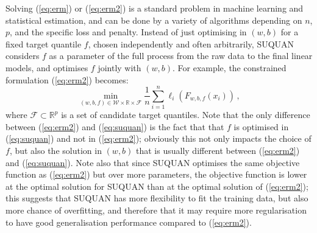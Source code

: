 \documentclass{article}
\newcommand{\RR}{\mathbb{R}} %
\newcommand{\Fcal}{\mathcal{F}}
\newcommand{\Wcal}{\mathcal{W}}
\begin{document}
Solving (\ref{eq:erm}) or (\ref{eq:erm2}) is a standard problem in machine learning and statistical estimation, and can be done by a variety of algorithms depending on $n$, $p$, and the specific loss and penalty. Instead of just optimising in $(w,b)$ for a fixed target quantile $f$, chosen independently and often arbitrarily, SUQUAN considers $f$ as a parameter of the full process from the raw data to the final linear models, and optimises $f$ jointly with $(w,b)$. For example, the constrained formulation (\ref{eq:erm2}) becomes:
\begin{equation}\label{eq:suquan}
\min_{(w,b,f)\in\Wcal\times\RR\times\Fcal} \frac{1}{n} \sum_{i=1}^n \ell_i\left(F_{w,b,f}(x_i)\right)\,,
\end{equation}
where $\Fcal\subset\RR^p$ is a set of candidate target quantiles.
Note that the only difference between (\ref{eq:erm2}) and (\ref{eq:suquan}) is the fact that that $f$ is optimised in (\ref{eq:suquan}) and not in (\ref{eq:erm2}); obviously this not only impacts the choice of $f$, but also the solution in $(w,b)$ that is usually different between (\ref{eq:erm2}) and (\ref{eq:suquan}). Note also that since SUQUAN optimises the same objective function as (\ref{eq:erm2}) but over more parameters, the objective function is lower at the optimal solution for SUQUAN than at the optimal solution of (\ref{eq:erm2}); this suggests that SUQUAN has more flexibility to fit the training data, but also more chance of overfitting, and therefore that it may require more regularisation to have good generalisation performance compared to (\ref{eq:erm2}). 
\end{document}
